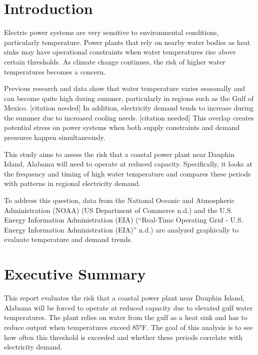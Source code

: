 \documentclass[
  letterpaper,
  DIV=11,
  numbers=noendperiod]{scrreprt}
\begin{document}

\chapter{Introduction}\label{introduction}

Electric power systems are very sensitive to environmental conditions,
particularly temperature. Power plants that rely on nearby water bodies
as heat sinks may have operational constraints when water temperatures
rise above certain thresholds. As climate change continues, the risk of
higher water temperatures becomes a concern.

Previous research and data show that water temperature varies seasonally
and can become quite high during summer, particularly in regions such as
the Gulf of Mexico. {[}citation needed{]} In addition, electricity
demand tends to increase during the summer due to increased cooling
needs. {[}citation needed{]} This overlap creates potential stress on
power systems when both supply constraints and demand pressures happen
simultaneously.

This study aims to assess the risk that a coastal power plant near
Dauphin Island, Alabama will need to operate at reduced capacity.
Specifically, it looks at the frequency and timing of high water
temperature and compares these periods with patterns in regional
electricity demand.

To address this question, data from the National Oceanic and Atmospheric
Administration (NOAA) (US Department of Commerce n.d.) and the U.S.
Energy Information Administration (EIA) ({``Real-Time {Operating Grid} -
{U}.{S}. {Energy Information Administration} ({EIA})''} n.d.) are
analyzed graphically to evaluate temperature and demand trends.


\chapter{Executive Summary}\label{executive-summary}

This report evaluates the risk that a coastal power plant near Dauphin
Island, Alabama will be forced to operate at reduced capacity due to
elevated gulf water temperatures. The plant relies on water from the
gulf as a heat sink and has to reduce output when temperatures exceed
85°F. The goal of this analysis is to see how often this threshold is
exceeded and whether these periods correlate with electricity demand.
\end{document}
